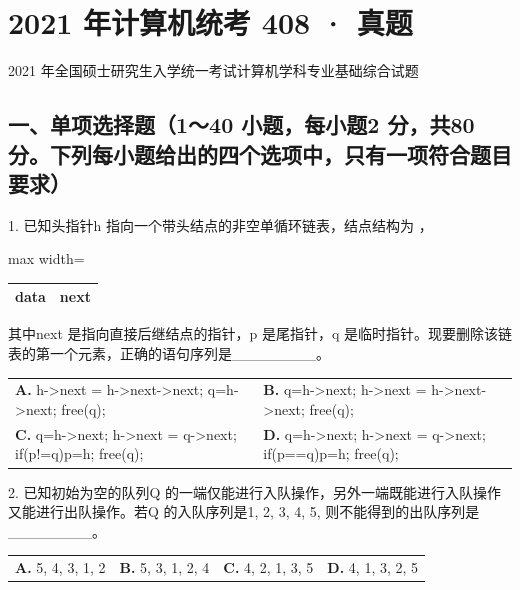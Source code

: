\documentclass[UTF8,11pt]{ctexart}
\begin{document}
\section*{2021 年计算机统考 408 · 真题}
2021 年全国硕士研究生入学统一考试计算机学科专业基础综合试题


\subsection*{一、单项选择题（1～40 小题，每小题2 分，共80 分。下列每小题给出的四个选项中，只有一项符合题目要求）}

1. 已知头指针h 指向一个带头结点的非空单循环链表，结点结构为  ，


\begin{center}\begin{adjustbox}{max width=\linewidth}\begin{tabular}{|>{\raggedright\arraybackslash}p{\dimexpr(\linewidth-4\tabcolsep-3\arrayrulewidth)/2\relax}|>{\raggedright\arraybackslash}p{\dimexpr(\linewidth-4\tabcolsep-3\arrayrulewidth)/2\relax}|}\hline
data & next\\\hline\end{tabular}\end{adjustbox}\end{center}

其中next 是指向直接后继结点的指针，p 是尾指针，q 是临时指针。现要删除该链表的第一个元素，正确的语句序列是\_\_\_\_\_\_\_\_。


\begin{center}\begin{tabular}{>{\raggedright\arraybackslash}p{\dimexpr(\linewidth-4\tabcolsep)/2\relax}>{\raggedright\arraybackslash}p{\dimexpr(\linewidth-4\tabcolsep)/2\relax}}
\textbf{A.} h->next = h->next->next; q=h->next; free(q); & \textbf{B.} q=h->next; h->next = h->next->next; free(q);\\[.35em]
\textbf{C.} q=h->next; h->next = q->next; if(p!=q)p=h; free(q); & \textbf{D.} q=h->next; h->next = q->next; if(p==q)p=h; free(q);\\[.35em]\end{tabular}\end{center}

2. 已知初始为空的队列Q 的一端仅能进行入队操作，另外一端既能进行入队操作又能进行出队操作。若Q 的入队序列是1, 2, 3, 4, 5, 则不能得到的出队序列是\_\_\_\_\_\_\_\_。


\begin{center}\begin{tabular}{>{\raggedright\arraybackslash}p{\dimexpr(\linewidth-8\tabcolsep)/4\relax}>{\raggedright\arraybackslash}p{\dimexpr(\linewidth-8\tabcolsep)/4\relax}>{\raggedright\arraybackslash}p{\dimexpr(\linewidth-8\tabcolsep)/4\relax}>{\raggedright\arraybackslash}p{\dimexpr(\linewidth-8\tabcolsep)/4\relax}}
\textbf{A.} 5, 4, 3, 1, 2 & \textbf{B.} 5, 3, 1, 2, 4 & \textbf{C.} 4, 2, 1, 3, 5 & \textbf{D.} 4, 1, 3, 2, 5\\[.35em]\end{tabular}\end{center}
\end{document}

